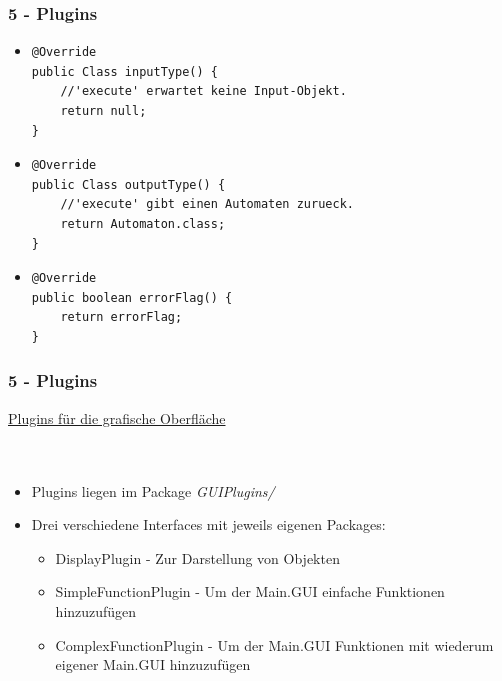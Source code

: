 \documentclass[9pt, xcolor={dvipsnames}]{beamer}
\begin{document}
\begin{frame}[fragile]\frametitle{5 - Plugins}
	\begin{itemize}
		\item[]
		\begin{lstlisting}[frame=single, basicstyle=\tiny]
@Override
public Class inputType() {
	//'execute' erwartet keine Input-Objekt.
	return null;
}
	\end{lstlisting}
	\pause
	\item[]
	\begin{lstlisting}[frame=single, basicstyle=\tiny]
@Override
public Class outputType() {
	//'execute' gibt einen Automaten zurueck.
	return Automaton.class;
}
	\end{lstlisting}
	\pause
	\item[]
	\begin{lstlisting}[frame=single, basicstyle=\tiny]
@Override
public boolean errorFlag() {
	return errorFlag;
}
		\end{lstlisting}
	\end{itemize}
\end{frame}

\begin{frame}\frametitle{5 - Plugins}
	{ \fontsize{20}{20} \selectfont \underline{Plugins für die grafische Oberfläche}}
	\ \\
	\ \\
	\ \\
	\pause
	\begin{itemize}
		\item Plugins liegen im Package \textit{GUIPlugins/}
		\item Drei verschiedene Interfaces mit jeweils eigenen Packages:
		\begin{itemize}
			\item DisplayPlugin - Zur Darstellung von Objekten
			\item SimpleFunctionPlugin - Um der Main.GUI einfache Funktionen hinzuzufügen
			\item ComplexFunctionPlugin - Um der Main.GUI Funktionen mit wiederum eigener Main.GUI hinzuzufügen
		\end{itemize}
	\end{itemize}
\end{frame}
\end{document}
